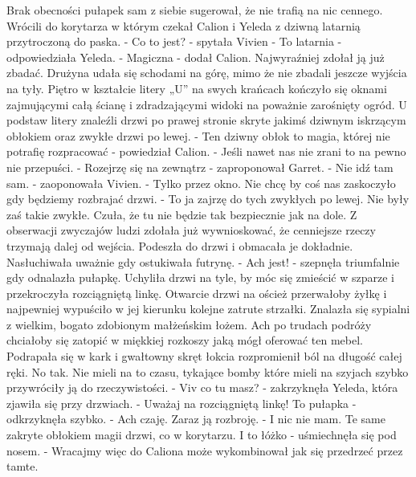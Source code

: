 \documentclass[10pt,twoside,twocolumn]{book}
\begin{document}
Brak obecności pułapek sam z siebie sugerował, że nie trafią na nic cennego. 
Wrócili do korytarza w którym czekał Calion i Yeleda z dziwną latarnią przytroczoną do paska.
\indent - Co to jest? - spytała Vivien\newline
\indent - To latarnia - odpowiedziała Yeleda.\newline
\indent - Magiczna - dodał Calion. Najwyraźniej zdołał ją już zbadać.\newline
Drużyna udała się schodami na górę, mimo że nie zbadali jeszcze wyjścia na tyły. 
Piętro w kształcie litery „U” na swych krańcach kończyło się oknami zajmującymi całą ścianę i zdradzającymi widoki na poważnie zarośnięty ogród.
U podstaw litery znaleźli drzwi po prawej stronie skryte jakimś dziwnym iskrzącym obłokiem oraz zwykłe drzwi po lewej.\newline
\indent - Ten dziwny obłok to magia, której nie potrafię rozpracować - powiedział Calion. - Jeśli nawet nas nie zrani to na pewno nie przepuści.\newline
\indent - Rozejrzę się na zewnątrz - zaproponował Garret.\newline
\indent - Nie idź tam sam. - zaoponowała Vivien.\newline
\indent - Tylko przez okno. Nie chcę by coś nas zaskoczyło gdy będziemy rozbrajać drzwi.\newline
\indent - To ja zajrzę do tych zwykłych po lewej.\newline
Nie były zaś takie zwykłe. 
Czuła, że tu nie będzie tak bezpiecznie jak na dole. 
Z obserwacji zwyczajów ludzi zdołała już wywnioskować, że cenniejsze rzeczy trzymają dalej od wejścia. 
Podeszła do drzwi i obmacała je dokładnie. 
Nasłuchiwała uważnie gdy ostukiwała futrynę.
\indent - Ach jest! - szepnęła triumfalnie gdy odnalazła pułapkę.\newline
Uchyliła drzwi na tyle, by móc się zmieścić w szparze i przekroczyła rozciągniętą linkę. Otwarcie drzwi na oścież przerwałoby żyłkę i najpewniej wypuściło w jej kierunku kolejne zatrute strzałki.
Znalazła się sypialni z wielkim, bogato zdobionym małżeńskim łożem. 
Ach po trudach podróży chciałoby się zatopić w miękkiej rozkoszy jaką mógł oferować ten mebel. 
Podrapała się w kark i gwałtowny skręt łokcia rozpromienił ból na długość całej ręki.
No tak. 
Nie mieli na to czasu, tykające bomby które mieli na szyjach szybko przywróciły ją do rzeczywistości.
\indent - Viv co tu masz? - zakrzyknęła Yeleda, która zjawiła się przy drzwiach.\newline
\indent - Uważaj na rozciągniętą linkę! To pułapka - odkrzyknęła szybko.\newline
\indent - Ach czaję. Zaraz ją rozbroję.\newline
\indent - I nic nie mam. Te same zakryte obłokiem magii drzwi, co w korytarzu. I to łóżko - uśmiechnęła się pod nosem.\newline
\indent - Wracajmy więc do Caliona może wykombinował jak się przedrzeć przez tamte.
\end{document}
